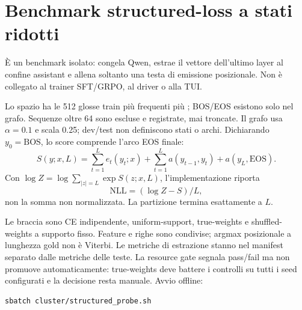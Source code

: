 \chapter{Benchmark structured-loss a stati ridotti}\label{chap:structured}
È un benchmark isolato: congela Qwen, estrae il vettore dell'ultimo layer al
confine assistant e allena soltanto una testa di emissione posizionale. Non è
collegato al trainer SFT/GRPO, al driver o alla TUI.

Lo spazio ha le 512 glosse train più frequenti più ; BOS/EOS
esistono solo nel grafo. Sequenze oltre 64 sono escluse e registrate, mai
troncate. Il grafo usa $\alpha=0.1$ e scala 0.25; dev/test non definiscono stati o
archi. Dichiarando $y_0=\mathrm{BOS}$, lo score comprende l'arco EOS finale:
\begin{equation}S(y;x,L)=\sum_{t=1}^{L}e_t(y_t;x)+
\sum_{t=1}^{L}a(y_{t-1},y_t)+a(y_L,\mathrm{EOS}).\end{equation}
Con $\log Z=\log\sum_{|z|=L}\exp S(z;x,L)$, l'implementazione riporta
\begin{equation}\mathrm{NLL}=(\log Z-S)/L,\end{equation}
non la somma non normalizzata. La partizione termina esattamente a $L$.

Le braccia sono CE indipendente, uniform-support, true-weights e
shuffled-weights a supporto fisso. Feature e righe sono condivise; argmax
posizionale a lunghezza gold non è Viterbi. Le metriche di estrazione stanno nel
manifest separato dalle metriche delle teste. La resource gate segnala pass/fail
ma non promuove automaticamente: true-weights deve battere i controlli su tutti
i seed configurati e la decisione resta manuale. Avvio offline:
\begin{lstlisting}[language=bash]
sbatch cluster/structured_probe.sh
\end{lstlisting}

